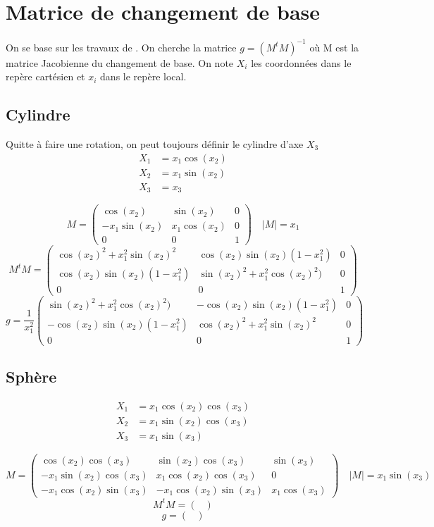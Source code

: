 \section{Matrice de changement de base}
On se base sur les travaux de \cite{lafitte_diffraction_1998}. On cherche la matrice $g=\left(M^tM\right)^{-1}$ où M est la matrice Jacobienne du changement de base.
On note $X_i$ les coordonnées dans le repère cartésien et $x_i$ dans le repère local.


\subsection{Cylindre}
Quitte à faire une rotation, on peut toujours définir le cylindre d'axe $X_3$
\begin{align*}
X_1 &= x_1 \cos(x_2) \\
X_2 &= x_1 \sin(x_2) \\
X_3 &= x_3
\end{align*}

\[
M = \begin{pmatrix}
\cos(x_2) & \sin(x_2) & 0 \\
-x_1\sin(x_2) & x_1\cos(x_2) & 0 \\
0 & 0 & 1
\end{pmatrix} \quad |M| = x_1
\]
\[
M^tM =
\begin{pmatrix}
\cos(x_2)^2 + x_1^2 \sin(x_2)^2 & \cos(x_2)\sin(x_2)(1-x_1^2) & 0 \\
\cos(x_2)\sin(x_2)(1-x_1^2) & \sin(x_2)^2 + x_1^2\cos(x_2)^2) & 0 \\
0 & 0 & 1
\end{pmatrix}
\]
\[
g = \frac{1}{x_1^2}
\begin{pmatrix}
\sin(x_2)^2 + x_1^2\cos(x_2)^2) & -\cos(x_2)\sin(x_2)(1-x_1^2) & 0 \\
-\cos(x_2)\sin(x_2)(1-x_1^2) & \cos(x_2)^2 + x_1^2 \sin(x_2)^2& 0 \\
0 & 0 & 1
\end{pmatrix}
\]
\subsection{Sphère}
\begin{align*}
X_1 &= x_1 \cos(x_2)\cos(x_3) \\
X_2 &= x_1 \sin(x_2)\cos(x_3) \\
X_3 &= x_1 \sin(x_3)
\end{align*}

\[
M = \begin{pmatrix}
\cos(x_2)\cos(x_3) & \sin(x_2)\cos(x_3) & \sin(x_3) \\
-x_1\sin(x_2)\cos(x_3) & x_1\cos(x_2)\cos(x_3) & 0 \\
-x_1 \cos(x_2)\sin(x_3) & -x_1 \cos(x_2)\sin(x_3) & x_1\cos(x_3)
\end{pmatrix} \quad |M| = x_1 \sin(x_3)
\]
\[
M^tM =
\begin{pmatrix}

\end{pmatrix}
\]
\[
g =
\begin{pmatrix}

\end{pmatrix}
\]